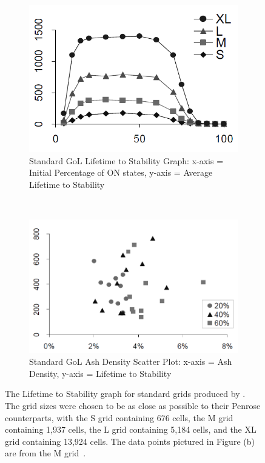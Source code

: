 \documentclass[a4paper,11pt,twoside]{report}
\begin{document}
\begin{figure}[htp]
\centering
\begin{subfigure}[t]{0.6\textwidth}
	\centering
	\includegraphics[width=\textwidth]{ch4_figs/hi05_fig6_lifetime}
	\caption{Standard GoL Lifetime to Stability Graph: x-axis = Initial Percentage of ON states, y-axis = Average Lifetime to Stability}
	\label{fig:hi05_reg_lifetime}
\end{subfigure}
~
\begin{subfigure}[t]{0.6\textwidth}
	\centering
	\includegraphics[width=\textwidth]{ch4_figs/hi05_fig8_reg_ash_density}
	\caption{Standard GoL Ash Density Scatter Plot: x-axis = Ash Density, y-axis = Lifetime to Stability}
	\label{fig:hi05_reg_density}
\end{subfigure}

\caption[\citeauthor{hi05}'s Standard GoL Lifetime and Ash Density Graphs]{
	The Lifetime to Stability graph for standard grids produced by \citeauthor{hi05}. The grid sizes were chosen to be as close as possible to their Penrose counterparts, with the S grid containing 676 cells, the M grid containing 1,937 cells, the L grid containing 5,184 cells, and the XL grid containing 13,924 cells. The data points pictured in Figure (b) are from the M grid~\cite{hi05}.
}

\end{figure}
\end{document}
